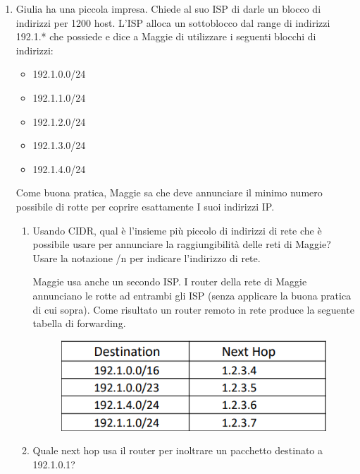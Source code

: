 \documentclass[11pt,a4paper,oneside]{book}
\theoremstyle{definition}
\begin{document}
\begin{enumerate}
	\item Giulia ha una piccola impresa. Chiede al suo ISP di darle un blocco di indirizzi per 1200 host. L’ISP alloca un sottoblocco dal range di indirizzi 192.1.* che possiede e dice a Maggie di utilizzare i
	      seguenti blocchi di indirizzi:

	      \begin{multicols}{2}
		      \begin{itemize}
			      \item 192.1.0.0/24
			      \item 192.1.1.0/24
			      \item 192.1.2.0/24
			      \item 192.1.3.0/24
			      \item 192.1.4.0/24
		      \end{itemize}
	      \end{multicols}

	      Come buona pratica, Maggie sa che deve annunciare il minimo numero possibile di rotte per coprire esattamente I suoi indirizzi IP.
	      \begin{enumerate}
		      \item Usando CIDR, qual è l’insieme più piccolo di indirizzi di rete che è possibile usare per annunciare la raggiungibilità delle reti di Maggie? Usare la notazione /n per indicare l’indirizzo di rete.

		            Maggie usa anche un secondo ISP. I router della rete di Maggie annunciano le rotte ad entrambi gli ISP (senza applicare la buona pratica di cui sopra). Come risultato un router remoto in rete produce la seguente tabella di forwarding.

		            \begin{figure}[!h]
			            \includegraphics[scale=0.35]{Immagini/Eser2.png}
			            \centering
		            \end{figure}

		      \item Quale next hop usa il router per inoltrare un pacchetto destinato a 192.1.0.1?
	      \end{enumerate}


\end{enumerate}
\end{document}
